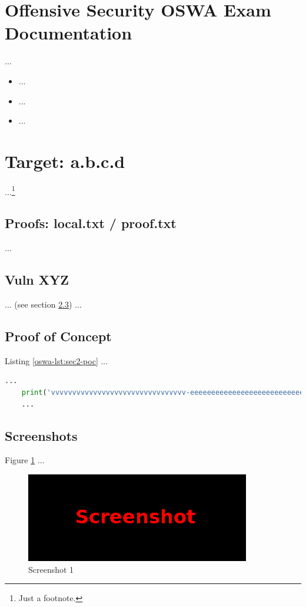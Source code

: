 %
%
%
\section{Offensive Security OSWA Exam Documentation}\label{oswa-sec:sec1}
%
...

\begin{itemize}
    \item ...
    \item ...
    \item ...
\end{itemize}
%
%
%
\section{Target: a.b.c.d}\label{oswa-sec:sec2}
%
...\footnote{Just a footnote.}
%
%
%
\subsection{Proofs: local.txt / proof.txt}\label{oswa-sec:sec2-proofs}
%
...
%
%
%
\subsection{Vuln XYZ}\label{oswa-sec:sec2-vuln}
%
... (see section \ref{oswa-sec:sec2-poc}) ...

%
%
%
\subsection{Proof of Concept}\label{oswa-sec:sec2-poc}
%
Listing \ref{oswa-lst:sec2-poc} ...\\

\begin{lstlisting}[language=Python,caption={Proof of Concept}, label={oswa-lst:sec2-poc}]
    ...
    print('vvvvvvvvvvvvvvvvvvvvvvvvvvvvvvvv-eeeeeeeeeeeeeeeeeeeeeeeeeeeeeeeeeeeeeeeeeee-looooooooooooooooooooooong-striiiiiiiiiiiiiing')
    ...
\end{lstlisting}
%
%
%
\subsection{Screenshots}\label{oswa-sec:sec2-screens}
%
Figure \ref{oswa-fig:sec2-screen1} ...

\begin{figure}[H]
    \centering
    \includegraphics[width=\textwidth]{img/assignment1/screen1.png}
    \caption{Screenshot 1}\label{oswa-fig:sec2-screen1}
\end{figure}
%
%
%
